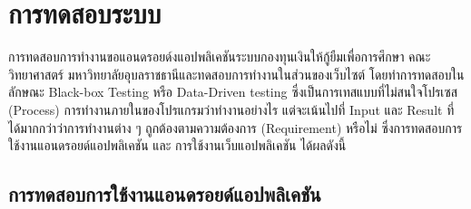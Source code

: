 \chapter{การทดสอบระบบ}
การทดสอบการทำงานขอแอนดรอยด์งแอปพลิเคชันระบบกองทุนเงินให้กู้ยืมเพื่อการศึกษา คณะวิทยาศาสตร์ มหาวิทยาลัยอุบลราชธานีและทดสอบการทำงานในส่วนของเว็บไซต์ โดยทำการทดสอบในลักษณะ Black-box Testing \cite{blackbox} หรือ Data-Driven testing ซึ่งเป็นการเทสแบบที่ไม่สนใจโปรเซส (Process) การทำงานภายในของโปรแกรมว่าทำงานอย่างไร แต่จะเน้นไปที่ Input และ Result ที่ได้มากกว่าว่าการทำงานต่าง ๆ ถูกต้องตามความต้องการ (Requirement) หรือไม่ ซึ่งการทดสอบการใช้งานแอนดรอยด์แอปพลิเคชัน และ การใช้งานเว็บแอปพลิเคชัน ได้ผลดังนี้

	\section{การทดสอบการใช้งานแอนดรอยด์แอปพลิเคชัน}
